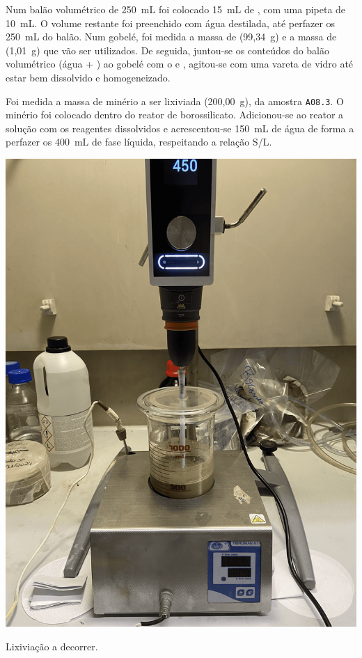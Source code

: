 Num balão volumétrico de 250~mL foi colocado 15~mL de \AMO{}, com uma pipeta de 10~mL\@.
O volume restante foi preenchido com água destilada, até perfazer os 250~mL do balão.
Num gobelé, foi medida a massa de \TSP{} (99,34~g) e a massa de \SCP{} (1,01~g) que vão ser utilizados.
De seguida, juntou-se os conteúdos do balão volumétrico (água + \AMO{}) ao gobelé com o \TSP{} e \SCP{}, agitou-se com uma vareta de vidro até estar bem dissolvido e homogeneizado.

Foi medida a massa de minério a ser lixiviada (200,00~g), da amostra \texttt{A08.3}.
O minério foi colocado dentro do reator de borossilicato.
Adicionou-se ao reator a solução com os reagentes dissolvidos e acrescentou-se 150~mL de água de forma a perfazer os 400~mL de fase líquida, respeitando a relação S/L\@.

\begin{marginfigure}[-8\baselineskip]
    \centering
    \includegraphics[width=0.9\linewidth]{figures/lixiviação-1 a decorrer}
    \caption{Lixiviação a decorrer.}
    \label{fig:lixiviacao1-a-decorrer}
\end{marginfigure}


